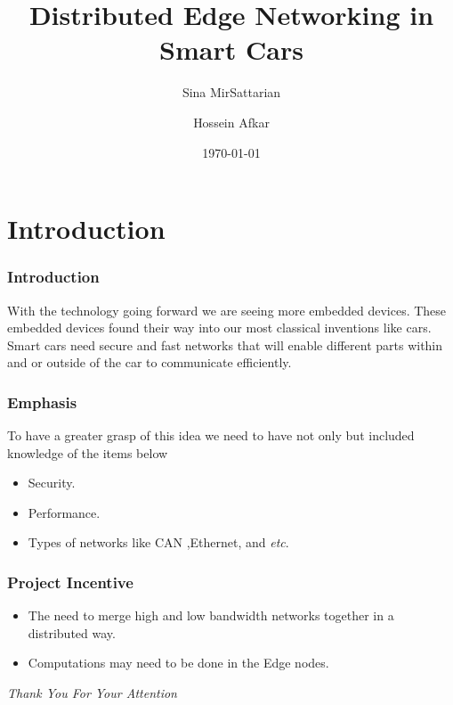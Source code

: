 \documentclass{beamer}
\title[Distributed Networking in Cars]
{Distributed Edge Networking in Smart Cars}
\author[MirSattarian, Afkar]{Sina MirSattarian \and Hossein Afkar}
\institute{University of Tehran}
\date{\today}
\begin{document}
\frame{\titlepage}

\section{Introduction}
\begin{frame}
    \frametitle{Introduction}
    With the technology going forward we are seeing more embedded devices.
    These embedded devices found their way into our most classical
    inventions like cars. Smart cars need secure and fast networks that will
    enable different parts within and or outside of the car to communicate
    efficiently. 
\end{frame}

\begin{frame}
    \frametitle{Emphasis}
    To have a greater grasp of this idea we need to have not only
    but included knowledge of the items below
    \begin{itemize}
        \item Security.
        \item Performance.
        \item Types of networks like CAN ,Ethernet, and \textit{etc}.
    \end{itemize}
\end{frame}

\begin{frame}
    \frametitle{Project Incentive}
    \begin{itemize}
        \item The need to merge high and low bandwidth networks together in a
            distributed way.
        \item Computations may need to be done in the Edge nodes.
    \end{itemize}
\end{frame}

\begin{frame}
  \centering \Large
  \emph{Thank You For Your Attention}
\end{frame}
\end{document}
